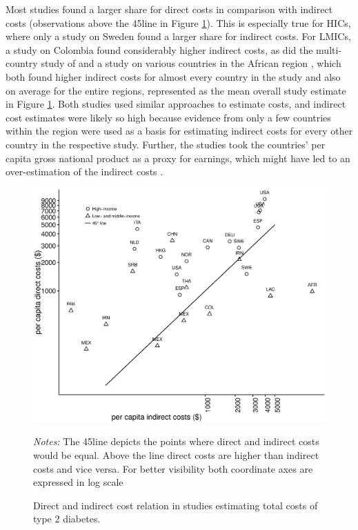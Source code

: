 \documentclass[12pt,english]{article}
\begin{document}
Most studies found a larger share for direct costs in comparison with indirect costs (observations above the 45\degree line in Figure \ref{fig:review_direct_indirect}). This is especially true for \acp{HIC}, where only a study on Sweden \parencite{Bolin2009d} found a larger share for indirect costs. For \acp{LMIC}, a study on Colombia \parencite{Gonzalez2009b} found considerably higher indirect costs, as did the multi-country study of \textcite{Barcelo2003} and a study on various countries in the African region \parencite{Kirigia2009}, which both found higher indirect costs for almost every country in the study and also on average for the entire regions, represented as the mean overall study estimate in Figure \ref{fig:review_direct_indirect}.  Both studies used similar approaches to estimate costs, and indirect cost estimates were likely so high because evidence from only a few countries within the region were used as a basis for estimating indirect costs for every other country in the respective study. Further, the studies took the countries' per capita gross national product as a proxy for earnings, which might have led to an over-estimation of the indirect costs \parencite{Kirigia2009}.

\begin{figure}[hp]
\caption{\label{fig:review_direct_indirect}Direct and indirect cost relation in studies estimating total costs of type 2 diabetes.}%
\begin{minipage}{\linewidth}
\begin{center}
\includegraphics[width=1\linewidth]{Review/Figures/Fig4.eps}\\
\end{center}
\footnotesize
\emph{Notes:} The 45\degree line depicts the points where direct and indirect costs would be equal. Above the line direct costs are higher than indirect costs and vice versa. For better visibility both coordinate axes are expressed in log scale
\end{minipage}
\end{figure}
\end{document}
